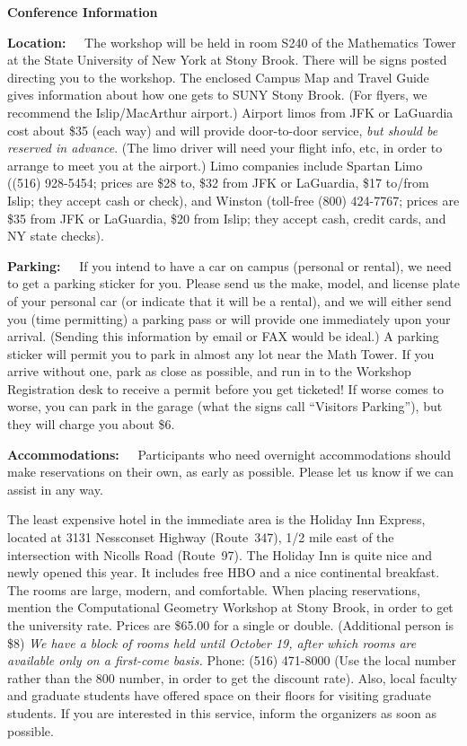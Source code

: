 \begin{center}

{\large\bf Conference Information}

\end{center}

{\bf Location:\ \ } The workshop will be held in room S240 of the
Mathematics Tower at the State University of New York at Stony Brook.
There will be signs posted directing you to the workshop.  The
enclosed Campus Map and Travel Guide gives information about how one
gets to SUNY Stony Brook.  (For flyers, we recommend the
Islip/MacArthur airport.)  Airport limos from JFK or LaGuardia cost
about \$35 (each way) and will provide door-to-door service, {\em
but should be reserved in advance}.  (The limo driver will need
your flight info, etc, in order to arrange to meet you at the airport.)
Limo companies include Spartan Limo ((516) 928-5454; prices are
\$28 to, \$32 from JFK or LaGuardia, \$17 to/from Islip; they accept
cash or check), and Winston (toll-free (800) 424-7767; prices are \$35
from JFK or LaGuardia, \$20 from Islip; they accept cash, credit
cards, and NY state checks).

\medskip
{\bf Parking:\ \ }
If you intend to have a car on campus (personal or rental), we need to
get a parking sticker for you.  Please send us the make, model, and
license plate of your personal car (or indicate that it will be a
rental), and we will either send you (time permitting) a parking pass
or will provide one immediately upon your arrival.  (Sending this
information by email or FAX would be ideal.)  A parking sticker will
permit you to park in almost any lot near the Math Tower.  If you
arrive without one, park as close as possible, and run in to the
Workshop Registration desk to receive a permit before you get
ticketed!  If worse comes to worse, you can park in the garage (what the
signs call ``Visitors Parking''), but they will charge you about \$6.

\medskip
{\bf Accommodations:\ \ }
Participants who need overnight accommodations should make reservations
on their own, as early as possible.  Please let us know if we can
assist in any way.  

The least expensive hotel in the immediate area is the Holiday Inn
Express, located at 3131 Nessconset Highway (Route~347), 1/2 mile east
of the intersection with Nicolls Road (Route~97).  The Holiday Inn is
quite nice and newly opened this year.  It includes free HBO and a
nice continental breakfast.  The rooms are large, modern, and
comfortable.  When placing reservations, mention the Computational
Geometry Workshop at Stony Brook, in order to get the university rate.
Prices are \$65.00 for a single or double.  (Additional person is \$8)
{\em We have a block of rooms held until October 19, after which rooms
are available only on a first-come basis.} Phone: (516) 471-8000 (Use
the local number rather than the 800 number, in order to get the
discount rate).
Also, local faculty and graduate students have offered space on their
floors for visiting graduate students.
If you are interested in this service, inform the organizers as soon
as possible.

